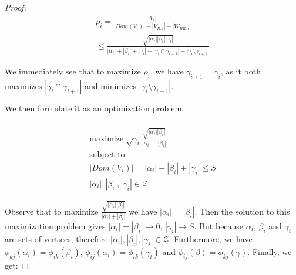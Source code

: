 \begin{proof}
	\begin{gather}
	\nonumber
	\rho_i = \frac{|V_i|}{|Dom(V_i)| - |V_{R,i}| + |W_{BR,i}|} \\
	\nonumber
	\le 
	\frac{\sqrt{|\alpha_i||\beta_i||\gamma_i|}}{|\alpha_i| + |\beta_i| + 
		|\gamma_i| - |\gamma_i \cap \gamma_{i+1}| +  |\gamma_i \setminus 
		\gamma_{i+1}|}
	\end{gather}
	
	We immediately see that to maximize $\rho_i$, we have $\gamma_{i+1} = 
	\gamma_i$, as it both maximizes $|\gamma_i \cap 
	\gamma_{i+1}|$ and minimizes $|\gamma_i \setminus \gamma_{i+1}|$.
	
	We then formulate it as an 
	optimization problem:
	
	
	
	
	
	\begin{multline}
	\\
	\text{maximize }
	\sqrt{\gamma_i}\frac{\sqrt{|\alpha_i| |\beta_i|}}{|\alpha_i| + |\beta_i|}\\
	\text{subject to: } \\
	|Dom(V_i)| = |\alpha_i| + |\beta_i| + |\gamma_i| \le S \\
	|\alpha_i|, |\beta_i|, |\gamma_i| \in \mathcal{Z} 
	\end{multline}
	
	Observe that to maximize $\frac{\sqrt{|\alpha_i| |\beta_i|}}{|\alpha_i| +
		|\beta_i|}$ we have $|\alpha_i| = |\beta_i|$. Then the solution to this
	maximization problem gives  $|\alpha_i| = |\beta_i| \rightarrow 0$, 
	$|\gamma_i|
	\rightarrow S$. But because $\alpha_i$, $\beta_i$ and $\gamma_i$ are sets 
	of 
	vertices, therefore $|\alpha_i|, |\beta_i|, |\gamma_i| \in \mathcal{Z}$.
	Furthermore, we have $\phi_{kj}(\alpha_i) =
	\phi_{ik}(\beta_i)$, $\phi_{ij}(\alpha_i) = \phi_{ik}(\gamma_i)$ and
	$\phi_{ij}(\beta) = \phi_{kj}(\gamma)$. Finally, we get:
	

\end{proof}

